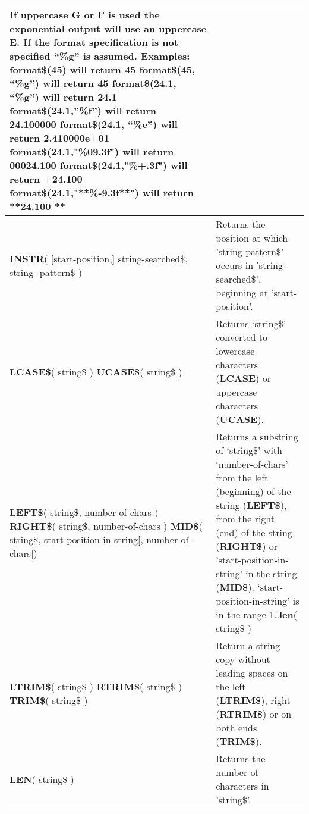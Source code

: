 \begin{table}[]
\begin{tabular}{|p{4cm}|p{10cm}|}
If uppercase G or F is used the exponential output will use an uppercase
E. If the format specification is not specified “\%g” is assumed.\newline
Examples:\newline
\textbf{format\$}(45) will return 45\newline
\textbf{format\$}(45, “\%g”) will return 45\newline
\textbf{format\$}(24.1, “\%g”) will return 24.1\newline
\textbf{format\$}(24.1,”\%f”) will return 24.100000\newline
\textbf{format\$}(24.1, “\%e”) will return 2.410000e+01\newline
\textbf{format\$}(24.1,"\%09.3f") will return 00024.100\newline
\textbf{format\$}(24.1,"\%+.3f") will return +24.100\newline
\textbf{format\$}(24.1,"**\%-9.3f**") will return **24.100  **
\\ \hline
\textbf{INSTR}( [start-position,]
string-searched\$, string-
pattern\$ )
 & Returns the position at which 'string-pattern\$' occurs in 'string-
searched\$', beginning at 'start-position'.
\\ \hline
\textbf{LCASE\$}( string\$ ) \newline
\textbf{UCASE\$}( string\$ ) 
& Returns ‘string\$’ converted to lowercase characters (\textbf{LCASE}) or uppercase characters (\textbf{UCASE}).
\\ \hline
\textbf{LEFT\$}( string\$, number-of-chars )\newline
\textbf{RIGHT\$}( string\$, number-of-chars )\newline
\textbf{MID\$}( string\$, start-position-in-string[, number-of-chars])
 & Returns a substring of ‘string\$’ with ‘number-of-chars’ from the left (beginning) of the string (\textbf{LEFT\$}), from the right (end) of the string (\textbf{RIGHT\$}) or 'start-position-in-string' in the string (\textbf{MID\$}). ‘start-position-in-string’ is in the range 1..\textbf{len}( string\$ )
\\ \hline
\textbf{LTRIM\$}( string\$ )\newline
\textbf{RTRIM\$}( string\$ )\newline
\textbf{TRIM\$}( string\$ )\newline
& Return a string copy without leading spaces on the left (\textbf{LTRIM\$}), right (\textbf{RTRIM\$}) or on both ends (\textbf{TRIM\$}).
\\ \hline
\textbf{LEN}( string\$ ) & Returns the number of characters in 'string\$'.

\end{tabular}
\end{table}
